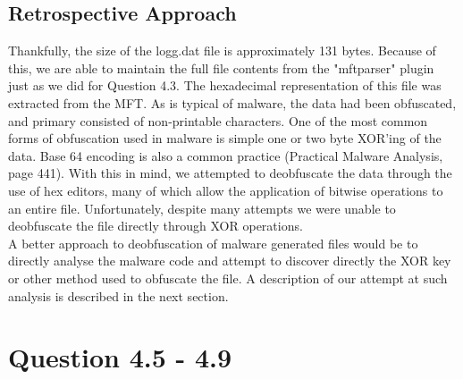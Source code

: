 \subsection{Retrospective Approach}
Thankfully, the size of the logg.dat file is approximately 131 bytes. Because of this, we are able to maintain the full file contents from the "mftparser" plugin just as we did for Question 4.3. The hexadecimal representation of this file was extracted from the MFT. As is typical of malware, the data had been obfuscated, and primary consisted of non-printable characters. One of the most common forms of obfuscation used in malware is simple one or two byte XOR'ing of the data. Base 64 encoding is also a common practice (Practical Malware Analysis, page 441). With this in mind, we attempted to deobfuscate the data through the use of hex editors, many of which allow the application of bitwise operations to an entire file. Unfortunately, despite many attempts we were unable to deobfuscate the file directly through XOR operations. \\ 
A better approach to deobfuscation of malware generated files would be to directly analyse the malware code and attempt to discover directly the XOR key or other method used to obfuscate the file. A description of our attempt at such analysis is described in the next section.\\


\section{Question 4.5 - 4.9}
